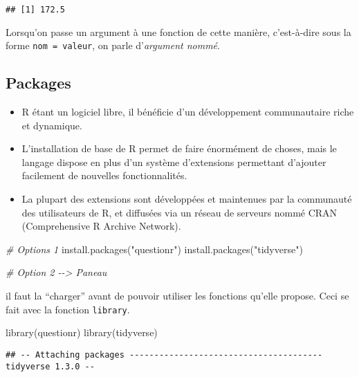 \documentclass[
]{article}
\newenvironment{Shaded}{\begin{snugshade}}{\end{snugshade}}
\newcommand{\CommentTok}[1]{\textcolor[rgb]{0.56,0.35,0.01}{\textit{#1}}}
\newcommand{\FunctionTok}[1]{\textcolor[rgb]{0.00,0.00,0.00}{#1}}
\newcommand{\NormalTok}[1]{#1}
\newcommand{\StringTok}[1]{\textcolor[rgb]{0.31,0.60,0.02}{#1}}
\begin{document}
\begin{verbatim}
## [1] 172.5
\end{verbatim}

\begin{rmdnote}
Lorsqu'on passe un argument à une fonction de cette manière,
c'est-à-dire sous la forme \texttt{nom\ =\ valeur}, on parle
d'\emph{argument nommé}.
\end{rmdnote}

\hypertarget{packages}{%
\subsection{Packages}\label{packages}}

\begin{itemize}
\item
  R étant un logiciel libre, il bénéficie d'un développement
  communautaire riche et dynamique.
\item
  L'installation de base de R permet de faire énormément de choses, mais
  le langage dispose en plus d'un système d'extensions permettant
  d'ajouter facilement de nouvelles fonctionnalités.
\item
  La plupart des extensions sont développées et maintenues par la
  communauté des utilisateurs de R, et diffusées via un réseau de
  serveurs nommé CRAN (Comprehensive R Archive Network).
\end{itemize}

\begin{Shaded}
\begin{Highlighting}[]
\CommentTok{\# Options 1}
\FunctionTok{install.packages}\NormalTok{(}\StringTok{"questionr"}\NormalTok{)}
\FunctionTok{install.packages}\NormalTok{(}\StringTok{"tidyverse"}\NormalTok{)}

\CommentTok{\# Option 2 {-}{-}\textgreater{} Paneau}
\end{Highlighting}
\end{Shaded}

il faut la ``charger'' avant de pouvoir utiliser les fonctions qu'elle
propose. Ceci se fait avec la fonction \texttt{library}.

\begin{Shaded}
\begin{Highlighting}[]
\FunctionTok{library}\NormalTok{(questionr)}
\FunctionTok{library}\NormalTok{(tidyverse)}
\end{Highlighting}
\end{Shaded}

\begin{verbatim}
## -- Attaching packages --------------------------------------- tidyverse 1.3.0 --
\end{verbatim}
\end{document}
